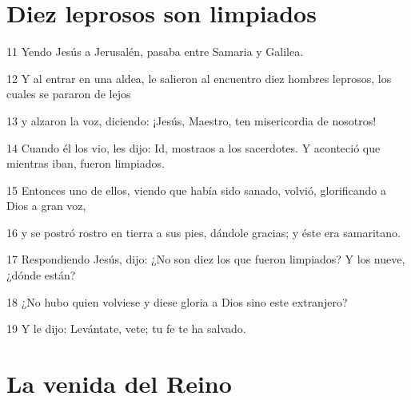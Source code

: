\section*{Diez leprosos son limpiados}

\par 11 Yendo Jesús a Jerusalén, pasaba entre Samaria y Galilea.
\par 12 Y al entrar en una aldea, le salieron al encuentro diez hombres leprosos, los cuales se pararon de lejos
\par 13 y alzaron la voz, diciendo: ¡Jesús, Maestro, ten misericordia de nosotros!
\par 14 Cuando él los vio, les dijo: Id, mostraos a los sacerdotes. Y aconteció que mientras iban, fueron limpiados.
\par 15 Entonces uno de ellos, viendo que había sido sanado, volvió, glorificando a Dios a gran voz,
\par 16 y se postró rostro en tierra a sus pies, dándole gracias; y éste era samaritano.
\par 17 Respondiendo Jesús, dijo: ¿No son diez los que fueron limpiados? Y los nueve, ¿dónde están?
\par 18 ¿No hubo quien volviese y diese gloria a Dios sino este extranjero?
\par 19 Y le dijo: Levántate, vete; tu fe te ha salvado.

\section*{La venida del Reino}

